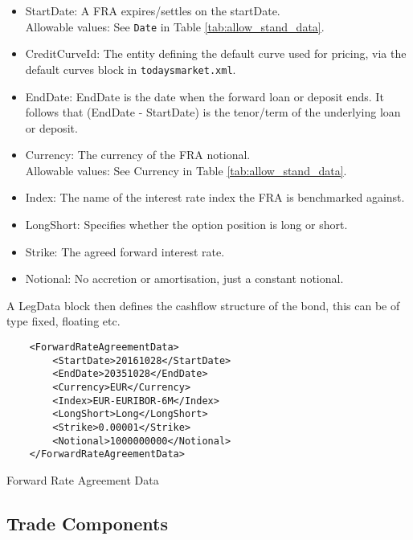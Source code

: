 \begin{itemize}
\item StartDate: A FRA expires/settles on the startDate. \\
Allowable values:  See \lstinline!Date! in Table \ref{tab:allow_stand_data}.
\item CreditCurveId: The entity defining the default curve used for pricing, via the default curves block in {\tt todaysmarket.xml}.
\item EndDate: EndDate is the date when the forward loan or deposit ends. It follows that (EndDate - StartDate) is the tenor/term of the underlying loan or deposit.
\item Currency: The currency of the FRA notional. \\
Allowable values:  See Currency in Table \ref{tab:allow_stand_data}.	
\item Index: The name of the interest rate index the FRA is benchmarked against.
\item LongShort: Specifies whether the option position is long  or
  short.
\item Strike: The agreed forward interest rate.
\item Notional: No accretion or amortisation, just a constant notional.
\end{itemize}

A LegData block then defines the cashflow structure of the bond, this can be of type fixed, floating etc.

\begin{listing}[H]
\begin{verbatim}
    <ForwardRateAgreementData>
        <StartDate>20161028</StartDate>
        <EndDate>20351028</EndDate>
        <Currency>EUR</Currency>
        <Index>EUR-EURIBOR-6M</Index>
        <LongShort>Long</LongShort>
        <Strike>0.00001</Strike>
        <Notional>1000000000</Notional>
    </ForwardRateAgreementData>
\end{verbatim}
\caption{Forward Rate Agreement Data}
\label{lst:ForwardRateAgreementdata}
\end{listing}

\subsection{Trade Components}

